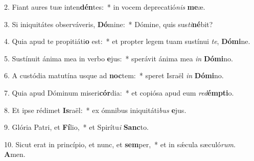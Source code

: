 2. Fiant aures tuæ inten\textbf{dén}tes:~*  in vocem deprecatió\textit{nis} \textbf{me}æ.\

3. Si iniquitátes observáveris, \textbf{Dó}mine:~*  Dómine, quis sus\textit{ti}\textbf{né}bit?\

4. Quia apud te propitiáti\textbf{o} est:~*  et propter legem tuam sustínui \textit{te}, \textbf{Dó}\textbf{mi}ne.\

5. Sustínuit ánima mea in verbo \textbf{e}jus:~*  sperávit ánima mea \textit{in} \textbf{Dó}\textbf{mi}no.\

6. A custódia matutína usque ad \textbf{noc}tem:~*  speret Israël \textit{in} \textbf{Dó}\textbf{mi}no.\

7. Quia apud Dóminum miseri\textbf{cór}dia:~*  et copiósa apud eum \textit{red}\textbf{émp}\textbf{ti}o.\

8. Et ipse rédimet \textbf{Is}raël:~*  ex ómnibus iniquitáti\textit{bus} \textbf{e}jus.\

9. Glória Patri, et \textbf{Fí}lio,~*  et Spirítu\textit{i} \textbf{Sanc}to.\

10. Sicut erat in princípio, et nunc, et \textbf{sem}per,~*  et in sǽcula sæculó\textit{rum}. \textbf{A}men.\

